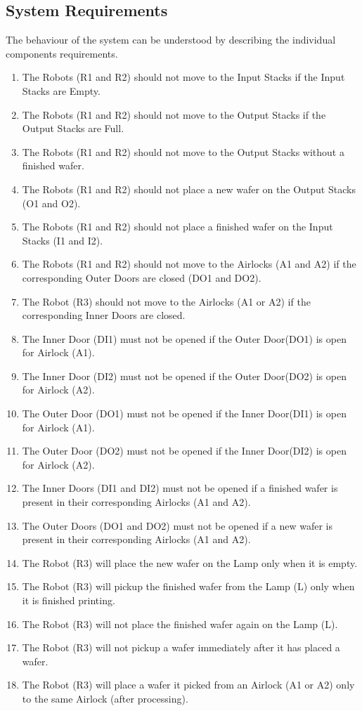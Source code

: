 \documentclass[a4paper,12pt]{article}
\begin{document}
\subsection{System Requirements}
The behaviour of the system can be understood by describing the individual components requirements.
\begin{enumerate}
\item The Robots (R1 and R2) should not move to the Input Stacks if the Input Stacks are Empty.

\item The Robots (R1 and R2) should not move to the Output Stacks if the Output Stacks are Full.
\item The Robots (R1 and R2) should not move to the Output Stacks without a finished wafer.
\item The Robots (R1 and R2) should not place a new wafer on the Output Stacks (O1 and O2).
\item The Robots (R1 and R2) should not place a finished wafer on the Input Stacks (I1 and I2).
\item The Robots (R1 and R2) should not move to the Airlocks (A1 and A2) if the corresponding Outer Doors are closed (DO1 and DO2).
\item The Robot (R3) should not move to the Airlocks (A1 or A2) if the corresponding Inner Doors are closed.
\item The Inner Door (DI1) must not be opened if the Outer Door(DO1) is open for Airlock (A1).
\item The Inner Door (DI2) must not be opened if the Outer Door(DO2) is open for Airlock (A2).
\item The Outer Door (DO1) must not be opened if the Inner Door(DI1) is open for Airlock (A1).
\item The Outer Door (DO2) must not be opened if the Inner Door(DI2) is open for Airlock (A2).
\item The Inner Doors (DI1 and DI2) must not be opened if a finished wafer is present in their corresponding Airlocks (A1 and A2).
\item The Outer Doors (DO1 and DO2) must not be opened if a new wafer is present in their corresponding Airlocks (A1 and A2).
\item The Robot (R3) will place the new wafer on the Lamp only when it is empty.
\item The Robot (R3) will pickup the finished wafer from the Lamp (L) only when it is finished printing.
\item The Robot (R3) will not place the finished wafer again on the Lamp (L).
\item The Robot (R3) will not pickup a wafer immediately after it has placed a wafer.
\item The Robot (R3) will place a wafer it picked from an Airlock (A1 or A2) only to the same Airlock (after processing). 
\end{enumerate}
\end{document}
